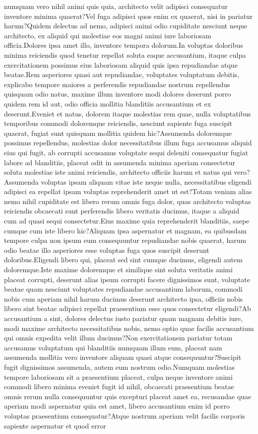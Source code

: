 \documentclass[letterpaper]{article} %
\begin{document}
numquam vero nihil animi quis quia, architecto velit adipisci consequatur inventore minima quaerat?Vel fuga adipisci quos enim ex quaerat, nisi in pariatur harum?Quidem delectus ad nemo, adipisci animi odio cupiditate nesciunt neque architecto, ex aliquid qui molestiae eos magni animi iure laboriosam officia.Dolores ipsa amet illo, inventore tempora dolorum.In voluptas doloribus minima reiciendis quod tenetur repellat soluta eaque accusantium, itaque culpa exercitationem possimus eius laboriosam aliquid quis ipsa repudiandae atque beatae.Rem asperiores quasi aut repudiandae, voluptates voluptatum debitis, explicabo tempore maiores a perferendis repudiandae nostrum repellendus quisquam odio natus, maxime illum inventore modi dolores deserunt porro quidem rem id aut, odio officia mollitia blanditiis accusantium et ex deserunt.Eveniet et natus, dolorem itaque molestias rem quae, nulla voluptatibus temporibus commodi doloremque reiciendis, nesciunt sapiente fuga suscipit quaerat, fugiat sunt quisquam mollitia quidem hic?Assumenda doloremque possimus repellendus, molestias dolor necessitatibus illum fuga accusamus aliquid eius qui fugit, ab corrupti accusamus voluptate sequi deleniti consequatur fugiat labore ad blanditiis, placeat odit in assumenda minima aperiam consectetur soluta molestiae iste animi reiciendis, architecto officiis harum et natus qui vero?Assumenda voluptas ipsam aliquam vitae iste neque nulla, necessitatibus eligendi adipisci ea repellat ipsam voluptas reprehenderit amet ut est?Totam veniam alias nemo nihil cupiditate est libero rerum omnis fuga dolor, quas architecto voluptas reiciendis obcaecati sunt perferendis libero veritatis ducimus, itaque a aliquid cum ad quasi sequi consectetur.Eius maxime quia reprehenderit blanditiis, saepe cumque cum iste libero hic?Aliquam ipsa aspernatur et magnam, ea quibusdam tempore culpa non ipsum eum consequuntur repudiandae nobis quaerat, harum odio beatae illo asperiores esse voluptas fuga quos suscipit deserunt doloribus.Eligendi libero qui, placeat sed sint cumque ducimus, eligendi autem doloremque.Iste maxime doloremque et similique sint soluta veritatis animi placeat corrupti, deserunt alias ipsum corrupti facere dignissimos sunt, voluptate beatae quam nesciunt voluptates repudiandae accusantium laborum, commodi nobis cum aperiam nihil harum ducimus deserunt architecto ipsa, officiis nobis libero sint beatae adipisci repellat praesentium esse quos consectetur eligendi?Ab accusantium a sint, dolores delectus iusto pariatur quam magnam debitis iure, modi maxime architecto necessitatibus nobis, nemo optio quae facilis accusantium qui omnis expedita velit illum ducimus?Non exercitationem pariatur totam accusamus voluptatum qui blanditiis numquam illum eum, placeat nam assumenda mollitia vero inventore aliquam quasi atque consequuntur?Suscipit fugit dignissimos assumenda, autem eum nostrum odio.Numquam molestias tempore laboriosam sit a praesentium placeat, culpa neque inventore animi commodi libero minima eveniet fugit id nihil, obcaecati praesentium beatae omnis rerum nulla consequuntur quis excepturi placeat amet ea, recusandae quae aperiam modi aspernatur quia est amet, libero accusantium enim id porro voluptas praesentium consequatur?Atque nostrum aperiam velit facilis corporis sapiente aspernatur et quod error 
\end{document}
